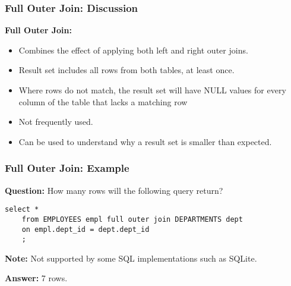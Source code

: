 \documentclass{beamer}
\begin{document}
\begin{frame}
  \frametitle{Full Outer Join: Discussion}
  
  \textbf{Full Outer Join:}

  \begin{itemize}
  \item Combines the effect of applying both left and right outer
    joins.
  \item Result set includes all rows from both tables, at least once.
  \item Where rows do not match, the result set will have NULL values
    for every column of the table that lacks a matching row
  \item Not frequently used.
  \item Can be used to understand why a result set is smaller than
    expected.
  \end{itemize}

\end{frame}

\begin{frame}[fragile] %
  \frametitle{Full Outer Join: Example}

  \textbf{Question:} How many rows will the following query return?

  \begin{lstlisting}[title={\tiny Source: https://github.com/Choens/sql-survival-guide/blob/master/sql/04-joins/full-outer-join.sql}]
    select *
    from EMPLOYEES empl full outer join DEPARTMENTS dept
    on empl.dept_id = dept.dept_id
    ;
  \end{lstlisting}

  \bigskip
  \textbf{Note: }Not supported by some SQL implementations such as
  SQLite.

  \bigskip
  \pause
  \textbf{Answer: }7 rows.
 
\end{frame}
\end{document}
